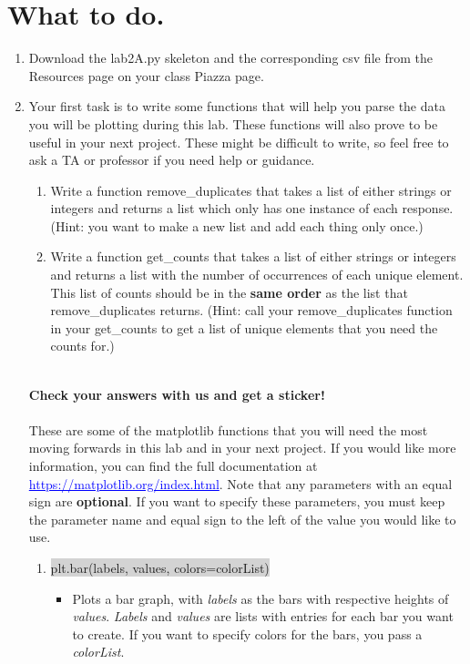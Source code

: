 \documentclass[11pt, letterpaper, onecolumn, oneside, final]{article}
\begin{document}
\section{What to do.}
\begin{enumerate}
\item Download the {\consolas lab2A.py} skeleton and the corresponding {\consolas csv} file from the Resources page on your class Piazza page. 
\item Your first task is to write some functions that will help you parse the data you will be plotting during this lab. These functions will also prove to be useful in your next project. These might be difficult to write, so feel free to ask a TA or professor if you need help or guidance.
\begin{enumerate}
\item Write a function {\consolas remove\_duplicates} that takes a list of either strings or integers and returns a list which only has one instance of each response. (Hint: you want to make a new list and add each thing only once.)
\item Write a function {\consolas get\_counts} that takes a list of either strings or integers and returns a list with the number of occurrences of each unique element. This list of counts should be in the \textbf{same order} as the list that {\consolas remove\_duplicates} returns. (Hint: call your {\consolas remove\_duplicates} function in your {\consolas get\_counts} to get a list of unique elements that you need the counts for.)\\\\
\end{enumerate}
\textbf{Check your answers with us and get a sticker!}\\\\
These are some of the {\consolas matplotlib} functions that you will need the most moving forwards in this lab and in your next project. If you would like more information, you can find the full documentation at
\textcolor{blue}{\underline{https://matplotlib.org/index.html}}. Note that any parameters with an equal sign are \textbf{optional}. If you want to specify these parameters, you must keep the parameter name and equal sign to the left of the value you would like to use.
\begin{enumerate}
\item \colorbox{lightgray}{\consolas plt.bar(labels, values, colors=colorList)}
\begin{itemize}
\item Plots a bar graph, with \textit{labels} as the bars with respective heights of \textit{values}. \textit{Labels} and \textit{values} are lists with entries for each bar you want to create. If you want to specify colors for the bars, you pass a \textit{colorList}.

\end{itemize}
\end{enumerate}
\end{enumerate}
\end{document}
